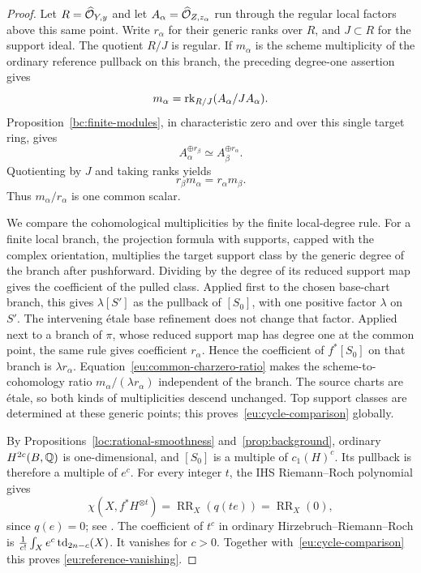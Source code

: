 \begin{proof}
Let $R=\widehat{\mathcal O}_{Y,y}$ and let
$A_\alpha=\widehat{\mathcal O}_{Z,z_\alpha}$ run through the regular local
factors above this same point.  Write $r_\alpha$ for their generic ranks
over $R$, and $J\subset R$ for the support ideal.  The quotient $R/J$
is regular.  If $m_\alpha$ is the scheme multiplicity of the ordinary
reference pullback on this branch, the preceding degree-one assertion
gives
\[
             m_\alpha=\operatorname{rk}_{R/J}(A_\alpha/JA_\alpha).
\]
Proposition~\ref{bc:finite-modules}, in characteristic zero and over
this single target ring, gives
\[
 A_\alpha^{\oplus r_\beta}\simeq
 A_\beta^{\oplus r_\alpha}.
\]
Quotienting by $J$ and taking ranks yields
\begin{equation}\label{eu:common-charzero-ratio}
              r_\beta m_\alpha=r_\alpha m_\beta.
\end{equation}
Thus $m_\alpha/r_\alpha$ is one common scalar.

We compare the cohomological multiplicities by the finite local-degree
rule.  For a finite local branch, the projection formula with supports,
capped with the complex orientation, multiplies the target support
class by the generic degree of the branch after pushforward.  Dividing
by the degree of its reduced support map gives the coefficient of the
pulled class.  Applied first to the chosen base-chart branch, this
gives $\lambda[S']$ as the pullback of $[S_0]$, with one positive
factor $\lambda$ on $S'$.  The intervening \'etale base refinement
does not change that factor.  Applied next to a branch of $\pi$, whose
reduced support map has degree one at the common point, the same rule
gives coefficient $r_\alpha$.  Hence the coefficient of $f^*[S_0]$
on that branch is $\lambda r_\alpha$.
Equation~\eqref{eu:common-charzero-ratio} makes the scheme-to-cohomology
ratio $m_\alpha/(\lambda r_\alpha)$ independent of the branch.
The source charts are \'etale, so both kinds of multiplicities descend
unchanged.  Top support classes are determined at these generic points;
this proves~\eqref{eu:cycle-comparison} globally.

By Propositions~\ref{loc:rational-smoothness} and~\ref{prop:background},
ordinary $H^{2c}(B,\mathbb Q)$ is one-dimensional, and $[S_0]$ is a multiple
of $c_1(H)^c$.  Its pullback
is therefore a multiple of $e^c$.  For every integer $t$, the IHS
Riemann--Roch polynomial gives
\[
 \chi(X,f^*H^{\otimes t})=\operatorname{RR}_X(q(te))
                        =\operatorname{RR}_X(0),
\]
since $q(e)=0$; see \cite[\S1.11]{Huybrechts1999}.
The coefficient of $t^c$ in ordinary Hirzebruch--Riemann--Roch is
$\frac1{c!}\int_Xe^c\operatorname{td}_{2n-c}(X)$.  It vanishes for $c>0$.
Together with~\eqref{eu:cycle-comparison} this proves
\eqref{eu:reference-vanishing}.


\end{proof}
